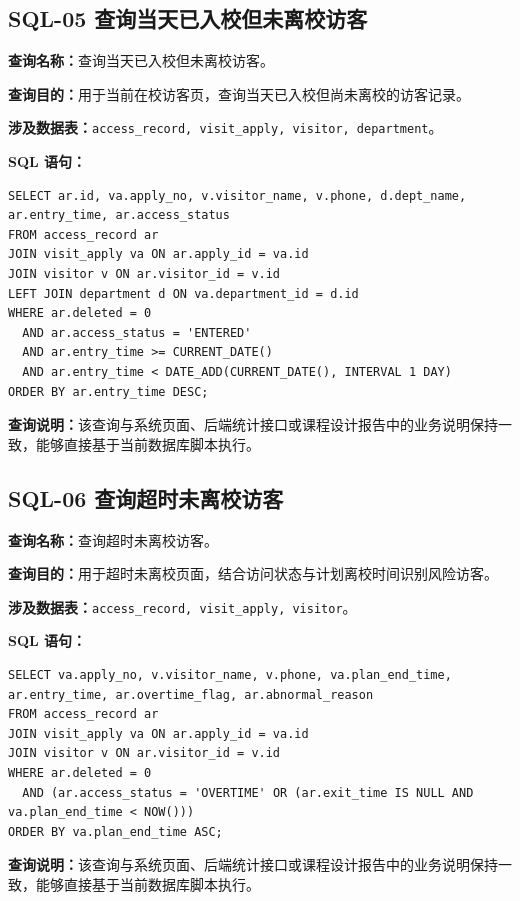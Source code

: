 \subsection{SQL-05 查询当天已入校但未离校访客}
\textbf{查询名称：}查询当天已入校但未离校访客。\par
\textbf{查询目的：}用于当前在校访客页，查询当天已入校但尚未离校的访客记录。\par
\textbf{涉及数据表：}\texttt{access\_record, visit\_apply, visitor, department}。\par
\textbf{SQL 语句：}
\begin{lstlisting}[style=sqlstyle]
SELECT ar.id, va.apply_no, v.visitor_name, v.phone, d.dept_name, ar.entry_time, ar.access_status
FROM access_record ar
JOIN visit_apply va ON ar.apply_id = va.id
JOIN visitor v ON ar.visitor_id = v.id
LEFT JOIN department d ON va.department_id = d.id
WHERE ar.deleted = 0
  AND ar.access_status = 'ENTERED'
  AND ar.entry_time >= CURRENT_DATE()
  AND ar.entry_time < DATE_ADD(CURRENT_DATE(), INTERVAL 1 DAY)
ORDER BY ar.entry_time DESC;
\end{lstlisting}
\textbf{查询说明：}该查询与系统页面、后端统计接口或课程设计报告中的业务说明保持一致，能够直接基于当前数据库脚本执行。

\subsection{SQL-06 查询超时未离校访客}
\textbf{查询名称：}查询超时未离校访客。\par
\textbf{查询目的：}用于超时未离校页面，结合访问状态与计划离校时间识别风险访客。\par
\textbf{涉及数据表：}\texttt{access\_record, visit\_apply, visitor}。\par
\textbf{SQL 语句：}
\begin{lstlisting}[style=sqlstyle]
SELECT va.apply_no, v.visitor_name, v.phone, va.plan_end_time, ar.entry_time, ar.overtime_flag, ar.abnormal_reason
FROM access_record ar
JOIN visit_apply va ON ar.apply_id = va.id
JOIN visitor v ON ar.visitor_id = v.id
WHERE ar.deleted = 0
  AND (ar.access_status = 'OVERTIME' OR (ar.exit_time IS NULL AND va.plan_end_time < NOW()))
ORDER BY va.plan_end_time ASC;
\end{lstlisting}
\textbf{查询说明：}该查询与系统页面、后端统计接口或课程设计报告中的业务说明保持一致，能够直接基于当前数据库脚本执行。


